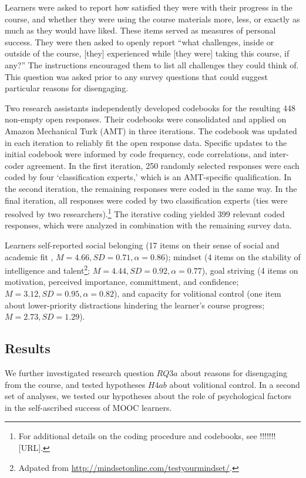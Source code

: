 \documentclass{sigchi}\usepackage[]{graphicx}\usepackage[]{color}
\begin{document}
Learners were asked to report how satisfied they were with their progress in the course, and whether they were using the course materials more, less, or exactly as much as they would have liked. These items served as measures of personal success. They were then asked to openly report ``what challenges, inside or outside of the course, [they] experienced while [they were] taking this course, if any?'' The instructions encouraged them to list all challenges they could think of. This question was asked prior to any survey questions that could suggest particular reasons for disengaging.

Two research assistants independently developed codebooks for the resulting 448 non-empty open responses. Their codebooks were consolidated and applied on Amazon Mechanical Turk (AMT) in three iterations. The codebook was updated in each iteration to reliably fit the open response data. Specific updates to the initial codebook were informed by code frequency, code correlations, and inter-coder agreement. In the first iteration, 250 randomly selected responses were each coded by four `classification experts,' which is an AMT-specific qualification. In the second iteration, the remaining responses were coded in the same way. In the final iteration, all responses were coded by two classification experts (ties were resolved by two researchers).\footnote{For additional details on the coding procedure and codebooks, see !!!!!!![URL].} The iterative coding yielded 399 relevant coded responses, which were analyzed in combination with the remaining survey data.

Learners self-reported social belonging (17 items on their sense of social and academic fit \cite{walton2007question}, $M=4.66, SD=0.71, \alpha=0.86$); mindset (4 items on the stability of intelligence and talent\footnote{Adpated from \url{http://mindsetonline.com/testyourmindset/}.}; $M=4.44, SD=0.92, \alpha=0.77$), goal striving (4 items on motivation, perceived importance, committment, and confidence; $M=3.12, SD=0.95, \alpha=0.82$), and capacity for volitional control (one item about lower-priority distractions hindering the learner's course progress; $M=2.73, SD=1.29$).

\subsection{Results}

We further investigated research question $RQ3a$ about reasons for disengaging from the course, and tested hypotheses $H4ab$ about volitional control. In a second set of analyses, we tested our hypotheses about the role of psychological factors in the self-ascribed success of MOOC learners.
\end{document}
